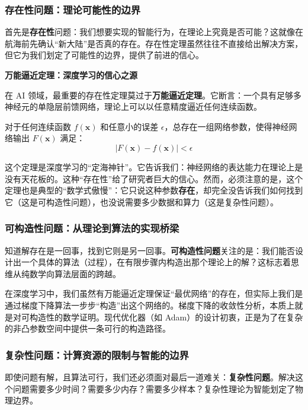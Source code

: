 \subsubsection{存在性问题：理论可能性的边界}

首先是\textbf{存在性}问题：我们想要实现的智能行为，在理论上究竟是否可能？这就像在航海前先确认“新大陆”是否真的存在。存在性定理虽然往往不直接给出解决方案，但它为我们划定了可能性的边界，提供了前进的信心。

\textbf{万能逼近定理：深度学习的信心之源}

在 AI 领域，最重要的存在性定理莫过于\textbf{万能逼近定理}。它断言：一个具有足够多神经元的单隐层前馈网络，理论上可以以任意精度逼近任何连续函数。

\begin{theorem} 
对于任何连续函数  $f(\mathbf{x})$ 和任意小的误差 $\epsilon$，总存在一组网络参数，使得神经网络输出 $F(\mathbf{x})$ 满足：
$$
|F(\mathbf{x}) - f(\mathbf{x})| < \epsilon
$$
\end{theorem}

这个定理是深度学习的“定海神针”。它告诉我们：神经网络的表达能力在理论上是没有天花板的。这种“存在性”给了研究者巨大的信心。然而，必须注意的是，这个定理也是典型的“数学式傲慢”：它只说这种参数\textbf{存在}，却完全没告诉我们如何找到它（这是可构造性问题），也没说需要多少数据和算力（这是复杂性问题）。

\subsubsection{可构造性问题：从理论到算法的实现桥梁}

知道解存在是一回事，找到它则是另一回事。\textbf{可构造性问题}关注的是：我们能否设计出一个具体的算法（过程），在有限步骤内构造出那个理论上的解？这标志着思维从纯数学向算法层面的跨越。

在深度学习中，我们虽然有万能逼近定理保证“最优网络”的存在，但实际上我们是通过梯度下降算法一步步“构造”出这个网络的。梯度下降的收敛性分析，本质上就是对可构造性的数学证明。现代优化器（如 Adam）的设计初衷，正是为了在复杂的非凸参数空间中提供一条可行的构造路径。

\subsubsection{复杂性问题：计算资源的限制与智能的边界}

即使问题有解，且算法可行，我们还必须面对最后一道难关：\textbf{复杂性问题}。解决这个问题需要多少时间？需要多少内存？需要多少样本？复杂性理论为智能划定了物理边界。

